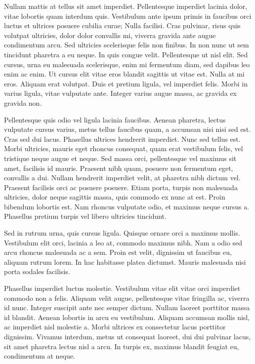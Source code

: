 Nullam mattis at tellus sit amet imperdiet. Pellentesque imperdiet lacinia dolor, vitae lobortis quam interdum quis. Vestibulum ante ipsum primis in faucibus orci luctus et ultrices posuere cubilia curae; Nulla facilisi. Cras pulvinar, risus quis volutpat ultricies, dolor dolor convallis mi, viverra gravida ante augue condimentum arcu. Sed ultricies scelerisque felis non finibus. In non nunc ut sem tincidunt pharetra a eu neque. In quis congue velit. Pellentesque ut nisl elit. Sed cursus, urna eu malesuada scelerisque, enim mi fermentum diam, sed dapibus leo enim ac enim. Ut cursus elit vitae eros blandit sagittis ut vitae est. Nulla at mi eros. Aliquam erat volutpat. Duis et pretium ligula, vel imperdiet felis. Morbi in varius ligula, vitae vulputate ante. Integer varius augue massa, ac gravida ex gravida non.

Pellentesque quis odio vel ligula lacinia faucibus. Aenean pharetra, lectus vulputate cursus varius, metus tellus faucibus quam, a accumsan nisi nisi sed est. Cras sed dui lacus. Phasellus ultrices hendrerit imperdiet. Nunc sed tellus est. Morbi ultricies, mauris eget rhoncus consequat, quam erat vestibulum felis, vel tristique neque augue et neque. Sed massa orci, pellentesque vel maximus sit amet, facilisis id mauris. Praesent nibh quam, posuere non fermentum eget, convallis a dui. Nullam hendrerit imperdiet velit, at pharetra nibh dictum vel. Praesent facilisis orci ac posuere posuere. Etiam porta, turpis non malesuada ultricies, dolor neque sagittis massa, quis commodo ex nunc at est. Proin bibendum lobortis est. Nam rhoncus vulputate odio, et maximus neque cursus a. Phasellus pretium turpis vel libero ultricies tincidunt.

Sed in rutrum urna, quis cursus ligula. Quisque ornare orci a maximus mollis. Vestibulum elit orci, lacinia a leo at, commodo maximus nibh. Nam a odio sed arcu rhoncus malesuada ac a sem. Proin est velit, dignissim ut faucibus eu, aliquam rutrum lorem. In hac habitasse platea dictumst. Mauris malesuada nisi porta sodales facilisis.

Phasellus imperdiet luctus molestie. Vestibulum vitae elit vitae orci imperdiet commodo non a felis. Aliquam velit augue, pellentesque vitae fringilla ac, viverra id nunc. Integer suscipit ante nec semper dictum. Nullam laoreet porttitor massa id blandit. Aenean lobortis in arcu eu vestibulum. Aliquam accumsan mollis nisl, ac imperdiet nisl molestie a. Morbi ultrices ex consectetur lacus porttitor dignissim. Vivamus interdum, metus ut consequat laoreet, dui dui pulvinar lacus, sit amet pharetra lectus nisl a arcu. In turpis ex, maximus blandit feugiat eu, condimentum at neque.

